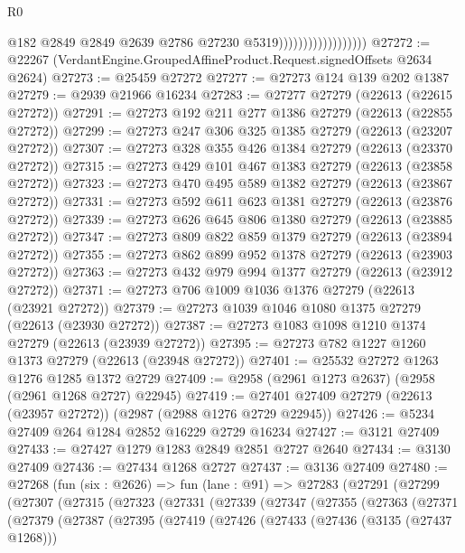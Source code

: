 \begin{lexlean}{R0}
\begin{coremodule}
                                        @182
                                        @2849
                                        @2849
                                        @2639
                                        @2786
                                        @27230
                                        @5319))))))))))))))))))
@27272 := @22267 (VerdantEngine.GroupedAffineProduct.Request.signedOffsets @2634 @2624)
@27273 := @25459 @27272
@27277 := @27273 @124 @139 @202 @1387
@27279 := @2939 @21966 @16234
@27283 := @27277 @27279 (@22613 (@22615 @27272))
@27291 := @27273 @192 @211 @277 @1386 @27279 (@22613 (@22855 @27272))
@27299 := @27273 @247 @306 @325 @1385 @27279 (@22613 (@23207 @27272))
@27307 := @27273 @328 @355 @426 @1384 @27279 (@22613 (@23370 @27272))
@27315 := @27273 @429 @101 @467 @1383 @27279 (@22613 (@23858 @27272))
@27323 := @27273 @470 @495 @589 @1382 @27279 (@22613 (@23867 @27272))
@27331 := @27273 @592 @611 @623 @1381 @27279 (@22613 (@23876 @27272))
@27339 := @27273 @626 @645 @806 @1380 @27279 (@22613 (@23885 @27272))
@27347 := @27273 @809 @822 @859 @1379 @27279 (@22613 (@23894 @27272))
@27355 := @27273 @862 @899 @952 @1378 @27279 (@22613 (@23903 @27272))
@27363 := @27273 @432 @979 @994 @1377 @27279 (@22613 (@23912 @27272))
@27371 := @27273 @706 @1009 @1036 @1376 @27279 (@22613 (@23921 @27272))
@27379 := @27273 @1039 @1046 @1080 @1375 @27279 (@22613 (@23930 @27272))
@27387 := @27273 @1083 @1098 @1210 @1374 @27279 (@22613 (@23939 @27272))
@27395 := @27273 @782 @1227 @1260 @1373 @27279 (@22613 (@23948 @27272))
@27401 := @25532 @27272 @1263 @1276 @1285 @1372 @2729
@27409 := @2958 (@2961 @1273 @2637) (@2958 (@2961 @1268 @2727) @22945)
@27419 := @27401 @27409 @27279 (@22613 (@23957 @27272)) (@2987 (@2988 @1276 @2729 @22945))
@27426 := @5234 @27409 @264 @1284 @2852 @16229 @2729 @16234
@27427 := @3121 @27409
@27433 := @27427 @1279 @1283 @2849 @2851 @2727 @2640
@27434 := @3130 @27409
@27436 := @27434 @1268 @2727
@27437 := @3136 @27409
@27480 := @27268
    (fun (six : @2626) =>
    fun (lane : @91) =>
    @27283
      (@27291
        (@27299
          (@27307
            (@27315
              (@27323
                (@27331
                  (@27339
                    (@27347
                      (@27355
                        (@27363
                          (@27371
                            (@27379
                              (@27387
                                (@27395
                                  (@27419
                                    (@27426
                                      (@27433
                                        (@27436 (@3135 (@27437 @1268)))

\end{coremodule}
\end{lexlean}
